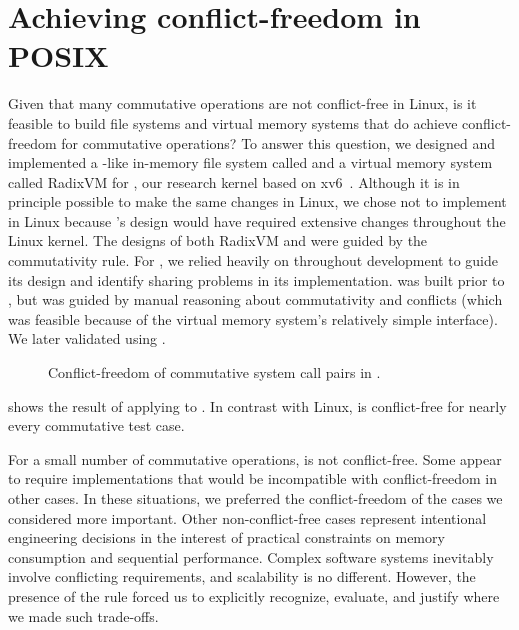 \section{Achieving conflict-freedom in POSIX}
\label{sec:sv6}


Given that many commutative operations are not conflict-free in Linux,
is it feasible to build file systems and virtual memory systems that
do achieve conflict-freedom for commutative operations?
%
To answer this
question, we designed and implemented a -like in-memory
file system called \fs and a virtual memory system called RadixVM for
\sys, our research kernel based on xv6~\cite{xv6}.
%
Although it is in principle possible to make the same changes in Linux,
we chose not to implement \fs in Linux because \fs's design
would have required extensive changes throughout the Linux kernel.
%
The designs of both RadixVM and \fs were guided by the
commutativity rule.  For \fs, we relied heavily on \tool throughout
development to guide its design and identify sharing problems in its
implementation.  \vm
was built prior to
\tool, but was guided by manual reasoning about commutativity and
conflicts (which was feasible because of the virtual memory system's
relatively simple interface).  We later validated \vm using \tool.

\begin{figure*}
\small
\centering
{}
\caption{Conflict-freedom of commutative system call pairs in \sys.}
\label{fig:testcase-breakdown-sv6}
\end{figure*}

 shows the result of applying \tool
to \sys.  In contrast with Linux, \sys is conflict-free for nearly
every commutative test case.

For a small number of commutative operations, \sys is not
conflict-free.  Some appear to require implementations that would be
incompatible with conflict-freedom in other cases.  In these
situations, we preferred the conflict-freedom of the cases we
considered more important.  Other non-conflict-free cases represent
intentional engineering decisions in the interest of practical
constraints on memory consumption and sequential performance.  Complex
software systems inevitably involve conflicting requirements, and
scalability is no different.  However, the presence of the rule forced
us to explicitly recognize, evaluate, and justify where we made such
trade-offs.

